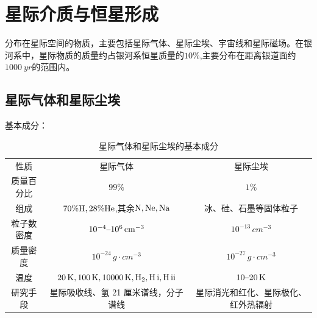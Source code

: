 \documentclass[../天体物理基础.tex]{subfiles}
\begin{document}
\section{星际介质与恒星形成}
分布在星际空间的物质，主要包括星际气体、星际尘埃、宇宙线和星际磁场。在银河系中，星际物质的质量约占银河系恒星质量的$10\%$,主要分布在距离银道面约$\qty{1000}{yr}$的范围内。

\subsection{星际气体和星际尘埃}
基本成分：
\begin{table}[!htbp]
\centering
\caption{星际气体和星际尘埃的基本成分}
\begin{tabular}{c c c}
\hline
性质 & 星际气体 & 星际尘埃\\
\cline{1-3}
质量百分比 & $99\%$ & $1\%$\\
\cline{1-3}
组成 & $70\%\ce{H},28\%\ce{He}$,其余$\ce{N,Ne,Na}$ & 冰、硅、石墨等固体粒子\\
\cline{1-3}
粒子数密度 & $10^{-4}\text{\textendash}10^{6}\,\unit{cm^{-3}}$ & $10^{-13}\,\unit{cm^{-3}}$\\
\cline{1-3}
质量密度 & $10^{-24}\,\unit{g\cdot cm^{-3}}$ & $10^{-27}\,\unit{g\cdot cm^{-3}}$\\
\cline{1-3}
温度 & $20\,\unit{K},100\,\unit{K},10000\,\unit{K},\ce{H2},\ce{H}\,\mathrm{\uppercase\expandafter{\romannumeral1}},\ce{H}\,\mathrm{\uppercase\expandafter{\romannumeral2}}$ & $10\text{\textendash}20\,\unit{K}$\\
\cline{1-3}
研究手段 & 星际吸收线、氢 21 厘米谱线，分子谱线 & 星际消光和红化、星际极化、红外热辐射\\
\hline
\end{tabular}
\label{}
\end{table}
\end{document}
